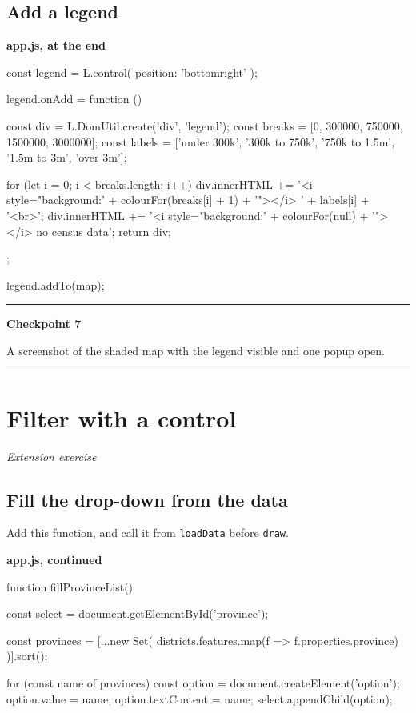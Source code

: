 \documentclass{article}
\newcommand{\cd}[1]{\texttt{#1}}
\newcommand{\codecap}[1]{%
  \par\vspace{.9em}\noindent\textbf{#1}\par\vspace{-.6em}}
\newenvironment{keypoint}[1]
  {\par\vspace{.7em}\noindent\rule{\linewidth}{.6pt}\par\vspace{.15em}
   \noindent\textbf{#1}\par\nobreak\vspace{-.3em}}
  {\par\vspace{.15em}\noindent\rule{\linewidth}{.6pt}\par\vspace{.7em}}
\begin{document}
\subsection{Add a legend}

\codecap{app.js, at the end}
\begin{code}
const legend = L.control({ position: 'bottomright' });

legend.onAdd = function () {
  const div = L.DomUtil.create('div', 'legend');
  const breaks = [0, 300000, 750000, 1500000, 3000000];
  const labels = ['under 300k', '300k to 750k', '750k to 1.5m',
                  '1.5m to 3m', 'over 3m'];

  for (let i = 0; i < breaks.length; i++) {
    div.innerHTML +=
      '<i style="background:' + colourFor(breaks[i] + 1) + '"></i> ' +
      labels[i] + '<br>';
  }
  div.innerHTML +=
    '<i style="background:' + colourFor(null) + '"></i> no census data';
  return div;
};

legend.addTo(map);
\end{code}

\begin{keypoint}{Checkpoint 7}
A screenshot of the shaded map with the legend visible and one popup
open.
\end{keypoint}


\section{Filter with a control}
\textit{Extension exercise}

\subsection{Fill the drop-down from the data}

Add this function, and call it from \cd{loadData} before \cd{draw}.

\codecap{app.js, continued}
\begin{code}
function fillProvinceList() {
  const select = document.getElementById('province');

  const provinces = [...new Set(
    districts.features.map(f => f.properties.province)
  )].sort();

  for (const name of provinces) {
    const option = document.createElement('option');
    option.value = name;
    option.textContent = name;
    select.appendChild(option);
  }
}
\end{code}
\end{document}
